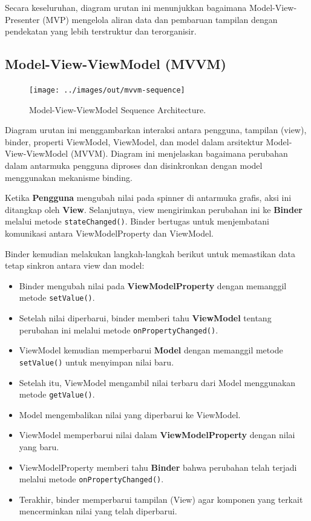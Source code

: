Secara keseluruhan, diagram urutan ini menunjukkan bagaimana Model-View-Presenter (MVP) mengelola aliran data dan pembaruan tampilan dengan pendekatan yang lebih terstruktur dan terorganisir.


\subsection{Model-View-ViewModel (MVVM)}
\begin{figure}[h]
	\centering
	\texttt{[image: ../images/out/mvvm-sequence]}
	\caption{Model-View-ViewModel Sequence Architecture.}
	\label{fig:mvvm-sequence}
\end{figure}

Diagram urutan ini menggambarkan interaksi antara pengguna, tampilan (view), binder, properti ViewModel, ViewModel, dan model dalam arsitektur Model-View-ViewModel (MVVM). Diagram ini menjelaskan bagaimana perubahan dalam antarmuka pengguna diproses dan disinkronkan dengan model menggunakan mekanisme binding.

Ketika \textbf{Pengguna} mengubah nilai pada spinner di antarmuka grafis, aksi ini ditangkap oleh \textbf{View}. Selanjutnya, view mengirimkan perubahan ini ke \textbf{Binder} melalui metode \texttt{stateChanged()}. Binder bertugas untuk menjembatani komunikasi antara ViewModelProperty dan ViewModel.

Binder kemudian melakukan langkah-langkah berikut untuk memastikan data tetap sinkron antara view dan model:

\begin{itemize}
	\item Binder mengubah nilai pada \textbf{ViewModelProperty} dengan memanggil metode \texttt{setValue()}.
	\item Setelah nilai diperbarui, binder memberi tahu \textbf{ViewModel} tentang perubahan ini melalui metode \texttt{onPropertyChanged()}.
	\item ViewModel kemudian memperbarui \textbf{Model} dengan memanggil metode \texttt{setValue()} untuk menyimpan nilai baru.
	\item Setelah itu, ViewModel mengambil nilai terbaru dari Model menggunakan metode \texttt{getValue()}.
	\item Model mengembalikan nilai yang diperbarui ke ViewModel.
	\item ViewModel memperbarui nilai dalam \textbf{ViewModelProperty} dengan nilai yang baru.
	\item ViewModelProperty memberi tahu \textbf{Binder} bahwa perubahan telah terjadi melalui metode \texttt{onPropertyChanged()}.
	\item Terakhir, binder memperbarui tampilan (View) agar komponen yang terkait mencerminkan nilai yang telah diperbarui.
\end{itemize}

